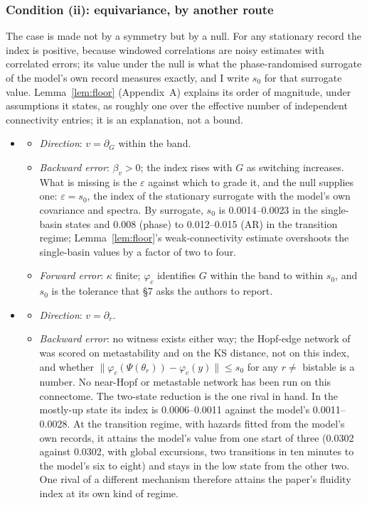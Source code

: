 \documentclass[11pt]{article}
\begin{document}
\subsubsection{Condition (ii): equivariance, by another route}
The case is made not by a symmetry but by a null. For any stationary record the index is positive, because windowed correlations are noisy estimates with correlated errors; its value under the null is what the phase-randomised surrogate of the model's own record measures exactly, and I write $s_0$ for that surrogate value. Lemma~\ref{lem:floor} (Appendix~A) explains its order of magnitude, under assumptions it states, as roughly one over the effective number of independent connectivity entries; it is an explanation, not a bound.
\begin{itemize}
\item[$\Theta_1$]
  \begin{itemize}
  \item \emph{Direction}: $v=\partial_G$ within the band.
  \item \emph{Backward error}: $\beta_v>0$; the index rises with $G$ as switching increases. What is missing is the $\varepsilon$ against which to grade it, and the null supplies one: $\varepsilon=s_0$, the index of the stationary surrogate with the model's own covariance and spectra. By surrogate, $s_0$ is 0.0014--0.0023 in the single-basin states and 0.008 (phase) to 0.012--0.015 (AR) in the transition regime; Lemma~\ref{lem:floor}'s weak-connectivity estimate overshoots the single-basin values by a factor of two to four.
  \item \emph{Forward error}: $\kappa$ finite; $\varphi_c$ identifies $G$ within the band to within $s_0$, and $s_0$ is the tolerance that \S7 asks the authors to report.
  \end{itemize}
\item[$\Theta_2$]
  \begin{itemize}
  \item \emph{Direction}: $v=\partial_r$.
  \item \emph{Backward error}: no witness exists either way; the Hopf-edge network of \textcite{deco2017} was scored on metastability and on the KS distance, not on this index, and whether $\|\varphi_c(\Psi(\theta_r))-\varphi_c(y)\|\le s_0$ for any $r\ne$ bistable is a number. No near-Hopf or metastable network has been run on this connectome. The two-state reduction is the one rival in hand. In the mostly-up state its index is 0.0006--0.0011 against the model's 0.0011--0.0028. At the transition regime, with hazards fitted from the model's own records, it attains the model's value from one start of three (0.0302 against 0.0302, with global excursions, two transitions in ten minutes to the model's six to eight) and stays in the low state from the other two. One rival of a different mechanism therefore attains the paper's fluidity index at its own kind of regime.

\end{itemize}
\end{itemize}
\end{document}
